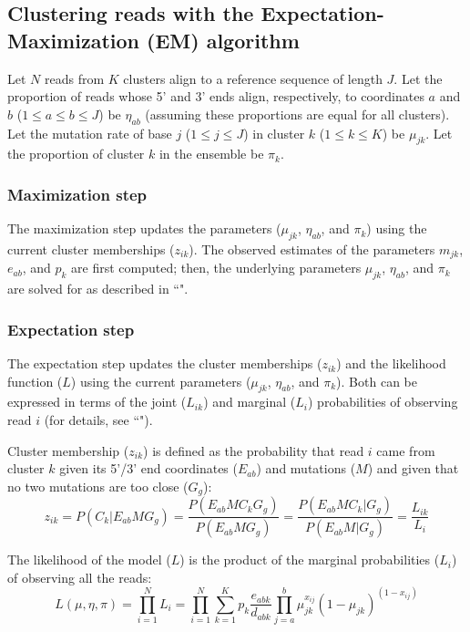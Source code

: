 \documentclass{article}
\begin{document}
\subsection{Clustering reads with the Expectation-Maximization (EM) algorithm}
\label{em-clustering}

Let $N$ reads from $K$ clusters align to a reference sequence of length $J$.
Let the proportion of reads whose 5' and 3' ends align, respectively, to coordinates $a$ and $b$ ($1 \le a \le b \le J$) be $\eta_{ab}$ (assuming these proportions are equal for all clusters).
Let the mutation rate of base $j$ ($1 \le j \le J$) in cluster $k$ ($1 \le k \le K$) be $\mu_{jk}$.
Let the proportion of cluster $k$ in the ensemble be $\pi_k$.

\subsubsection{Maximization step}
\label{maximization-step}

The maximization step updates the parameters ($\mu_{jk}$, $\eta_{ab}$, and $\pi_k$) using the current cluster memberships ($z_{ik}$).
The observed estimates of the parameters $m_{jk}$, $e_{ab}$, and $p_k$ are first computed; then, the underlying parameters $\mu_{jk}$, $\eta_{ab}$, and $\pi_k$ are solved for as described in ``".

\subsubsection{Expectation step}
\label{expectation-step}

The expectation step updates the cluster memberships ($z_{ik}$) and the likelihood function ($L$) using the current parameters ($\mu_{jk}$, $\eta_{ab}$, and $\pi_k$).
Both can be expressed in terms of the joint ($L_{ik}$) and marginal ($L_i$) probabilities of observing read $i$ (for details, see ``").

Cluster membership ($z_{ik}$) is defined as the probability that read $i$ came from cluster $k$ given its 5'/3' end coordinates ($E_{ab}$) and mutations ($M$) and given that no two mutations are too close ($G_g$):
\begin{equation}
    z_{ik} = P(C_k | E_{ab} M G_g) = \frac{P(E_{ab} M C_k G_g)}{P(E_{ab} M G_g)} = \frac{P(E_{ab} M C_k | G_g)}{P(E_{ab} M | G_g)} = \frac{L_{ik}}{L_i}
\end{equation}

The likelihood of the model ($L$) is the product of the marginal probabilities ($L_i$) of observing all the reads:
\begin{equation}
    L(\mu, \eta, \pi) = \prod_{i=1}^{N} L_i = \prod_{i=1}^{N} \sum_{k=1}^{K} p_k \frac{e_{abk}}{d_{abk}} \prod_{j=a}^{b} \mu_{jk}^{x_{ij}} (1 - \mu_{jk})^{(1 - x_{ij})}
\end{equation}
\end{document}

